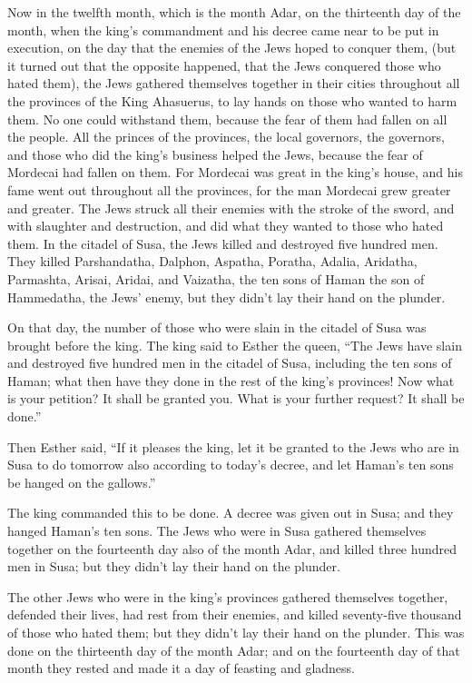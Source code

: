  Now in the twelfth month, which is the month Adar, on the
thirteenth day of the month, when the king's commandment and his decree
came near to be put in execution, on the day that the enemies of the
Jews hoped to conquer them, (but it turned out that the opposite
happened, that the Jews conquered those who hated them), 
the Jews gathered themselves together in their cities throughout all the
provinces of the King Ahasuerus, to lay hands on those who wanted to
harm them. No one could withstand them, because the fear of them had
fallen on all the people.  All the princes of the provinces,
the local governors, the governors, and those who did the king's
business helped the Jews, because the fear of Mordecai had fallen on
them.  For Mordecai was great in the king's house, and his
fame went out throughout all the provinces, for the man Mordecai grew
greater and greater.  The Jews struck all their enemies with
the stroke of the sword, and with slaughter and destruction, and did
what they wanted to those who hated them.  In the citadel of
Susa, the Jews killed and destroyed five hundred men.  They
killed Parshandatha, Dalphon, Aspatha,  Poratha, Adalia,
Aridatha,  Parmashta, Arisai, Aridai, and Vaizatha,
 the ten sons of Haman the son of Hammedatha, the Jews'
enemy, but they didn't lay their hand on the plunder.

 On that day, the number of those who were slain in the
citadel of Susa was brought before the king.  The king said
to Esther the queen, ``The Jews have slain and destroyed five hundred
men in the citadel of Susa, including the ten sons of Haman; what then
have they done in the rest of the king's provinces! Now what is your
petition? It shall be granted you. What is your further request? It
shall be done.''

 Then Esther said, ``If it pleases the king, let it be
granted to the Jews who are in Susa to do tomorrow also according to
today's decree, and let Haman's ten sons be hanged on the gallows.''

 The king commanded this to be done. A decree was given out
in Susa; and they hanged Haman's ten sons.  The Jews who
were in Susa gathered themselves together on the fourteenth day also of
the month Adar, and killed three hundred men in Susa; but they didn't
lay their hand on the plunder.

 The other Jews who were in the king's provinces gathered
themselves together, defended their lives, had rest from their enemies,
and killed seventy-five thousand of those who hated them; but they
didn't lay their hand on the plunder.  This was done on the
thirteenth day of the month Adar; and on the fourteenth day of that
month they rested and made it a day of feasting and gladness.

